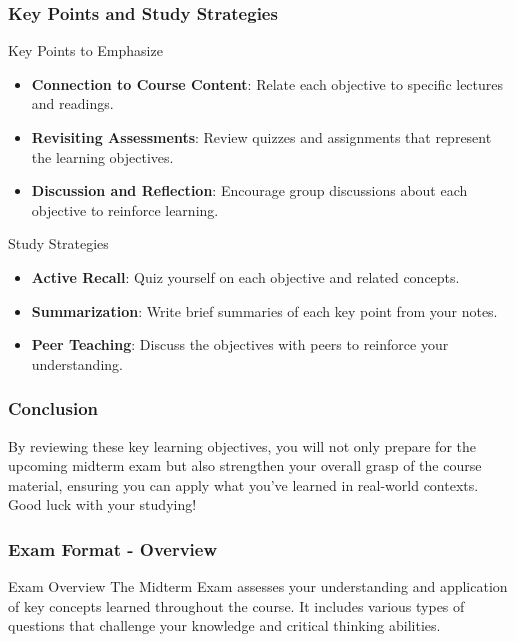 \documentclass[aspectratio=169]{beamer}
\begin{document}
\begin{frame}[fragile]
    \frametitle{Key Points and Study Strategies}
    \begin{block}{Key Points to Emphasize}
        \begin{itemize}
            \item \textbf{Connection to Course Content}: Relate each objective to specific lectures and readings.
            \item \textbf{Revisiting Assessments}: Review quizzes and assignments that represent the learning objectives.
            \item \textbf{Discussion and Reflection}: Encourage group discussions about each objective to reinforce learning.
        \end{itemize}
    \end{block}
    
    \begin{block}{Study Strategies}
        \begin{itemize}
            \item \textbf{Active Recall}: Quiz yourself on each objective and related concepts.
            \item \textbf{Summarization}: Write brief summaries of each key point from your notes.
            \item \textbf{Peer Teaching}: Discuss the objectives with peers to reinforce your understanding.
        \end{itemize}
    \end{block}
\end{frame}

\begin{frame}[fragile]
    \frametitle{Conclusion}
    By reviewing these key learning objectives, you will not only prepare for the upcoming midterm exam but also strengthen your overall grasp of the course material, ensuring you can apply what you've learned in real-world contexts. Good luck with your studying!
\end{frame}

\begin{frame}[fragile]
    \frametitle{Exam Format - Overview}
    \begin{block}{Exam Overview}
        The Midterm Exam assesses your understanding and application of key concepts learned throughout the course. It includes various types of questions that challenge your knowledge and critical thinking abilities.
    \end{block}
\end{frame}
\end{document}

